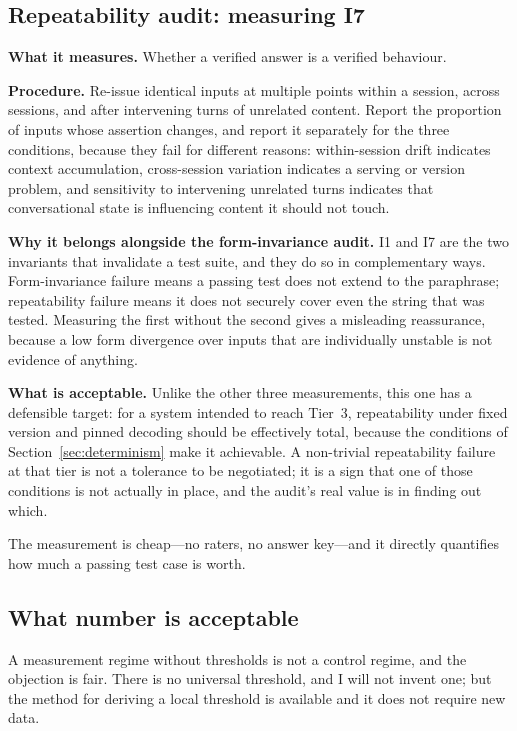 \subsection{Repeatability audit: measuring I7}

\textbf{What it measures.} Whether a verified answer is a verified behaviour.

\textbf{Procedure.} Re-issue identical inputs at multiple points within a session,
across sessions, and after intervening turns of unrelated content. Report the proportion
of inputs whose assertion changes, and report it separately for the three conditions,
because they fail for different reasons: within-session drift indicates context
accumulation, cross-session variation indicates a serving or version problem, and
sensitivity to intervening unrelated turns indicates that conversational state is
influencing content it should not touch.

\textbf{Why it belongs alongside the form-invariance audit.} I1 and I7 are the two
invariants that invalidate a test suite, and they do so in complementary ways.
Form-invariance failure means a passing test does not extend to the paraphrase;
repeatability failure means it does not securely cover even the string that was tested.
Measuring the first without the second gives a misleading reassurance, because a low form
divergence over inputs that are individually unstable is not evidence of anything.

\textbf{What is acceptable.} Unlike the other three measurements, this one has a defensible
target: for a system intended to reach Tier~3, repeatability under fixed version and
pinned decoding should be effectively total, because the conditions of
Section~\ref{sec:determinism} make it achievable. A non-trivial repeatability failure at
that tier is not a tolerance to be negotiated; it is a sign that one of those conditions is
not actually in place, and the audit's real value is in finding out which.

The measurement is cheap---no raters, no answer key---and it directly quantifies how much
a passing test case is worth.

\subsection{What number is acceptable}
\label{sec:thresholds}

A measurement regime without thresholds is not a control regime, and the objection is
fair. There is no universal threshold, and I will not invent one; but the method for
deriving a local threshold is available and it does not require new data.

